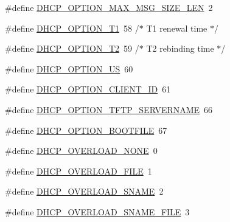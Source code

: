 \begin{DoxyCompactItemize}
\#define \hyperlink{openmote-cc2538_2lwip_2src_2include_2lwip_2prot_2dhcp_8h_a73960c1209385e0b3f8d9c0e4f6f438f}{D\+H\+C\+P\+\_\+\+O\+P\+T\+I\+O\+N\+\_\+\+M\+A\+X\+\_\+\+M\+S\+G\+\_\+\+S\+I\+Z\+E\+\_\+\+L\+EN}~2
\item 
\#define \hyperlink{openmote-cc2538_2lwip_2src_2include_2lwip_2prot_2dhcp_8h_ac32aa14a7fed99bcff08d10ca2dafc4d}{D\+H\+C\+P\+\_\+\+O\+P\+T\+I\+O\+N\+\_\+\+T1}~58 /$\ast$ T1 renewal time $\ast$/
\item 
\#define \hyperlink{openmote-cc2538_2lwip_2src_2include_2lwip_2prot_2dhcp_8h_ab9a44c5141f2c790f94ec2dd8a1a4f7e}{D\+H\+C\+P\+\_\+\+O\+P\+T\+I\+O\+N\+\_\+\+T2}~59 /$\ast$ T2 rebinding time $\ast$/
\item 
\#define \hyperlink{openmote-cc2538_2lwip_2src_2include_2lwip_2prot_2dhcp_8h_ac004aa5925855cd107487c9312b5163a}{D\+H\+C\+P\+\_\+\+O\+P\+T\+I\+O\+N\+\_\+\+US}~60
\item 
\#define \hyperlink{openmote-cc2538_2lwip_2src_2include_2lwip_2prot_2dhcp_8h_ad1167da7c0637c6b1ef309115c25b7e6}{D\+H\+C\+P\+\_\+\+O\+P\+T\+I\+O\+N\+\_\+\+C\+L\+I\+E\+N\+T\+\_\+\+ID}~61
\item 
\#define \hyperlink{openmote-cc2538_2lwip_2src_2include_2lwip_2prot_2dhcp_8h_a03f2ea40cc8472e24c994c5882815f7c}{D\+H\+C\+P\+\_\+\+O\+P\+T\+I\+O\+N\+\_\+\+T\+F\+T\+P\+\_\+\+S\+E\+R\+V\+E\+R\+N\+A\+ME}~66
\item 
\#define \hyperlink{openmote-cc2538_2lwip_2src_2include_2lwip_2prot_2dhcp_8h_a75ddf8dd302393bf841cab237615eb67}{D\+H\+C\+P\+\_\+\+O\+P\+T\+I\+O\+N\+\_\+\+B\+O\+O\+T\+F\+I\+LE}~67
\item 
\#define \hyperlink{openmote-cc2538_2lwip_2src_2include_2lwip_2prot_2dhcp_8h_abcd7ac0e3fe54f86f33d1b79855d5de7}{D\+H\+C\+P\+\_\+\+O\+V\+E\+R\+L\+O\+A\+D\+\_\+\+N\+O\+NE}~0
\item 
\#define \hyperlink{openmote-cc2538_2lwip_2src_2include_2lwip_2prot_2dhcp_8h_a04a7b3f1d9138c82c51f2752d440c13e}{D\+H\+C\+P\+\_\+\+O\+V\+E\+R\+L\+O\+A\+D\+\_\+\+F\+I\+LE}~1
\item 
\#define \hyperlink{openmote-cc2538_2lwip_2src_2include_2lwip_2prot_2dhcp_8h_a76d647c8774a4169ac92e01400bbb6ea}{D\+H\+C\+P\+\_\+\+O\+V\+E\+R\+L\+O\+A\+D\+\_\+\+S\+N\+A\+ME}~2
\item 
\#define \hyperlink{openmote-cc2538_2lwip_2src_2include_2lwip_2prot_2dhcp_8h_a07ea61064695eda45483c4c0a192614c}{D\+H\+C\+P\+\_\+\+O\+V\+E\+R\+L\+O\+A\+D\+\_\+\+S\+N\+A\+M\+E\+\_\+\+F\+I\+LE}~3
\end{DoxyCompactItemize}
